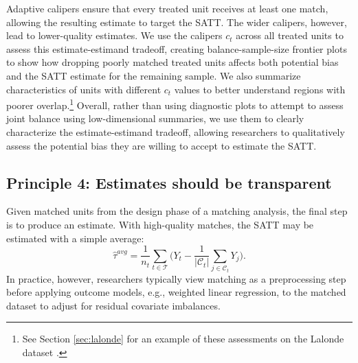 \documentclass{article}
\newcommand{\Rp}{\mathbb{R}^p}
\newcommand{\Ct}{\mathcal{C}_{t}}
\begin{document}
Adaptive calipers ensure that every treated unit receives at least one match, allowing the resulting estimate to target the SATT.
The wider calipers, however, lead to lower-quality estimates.
We use the calipers $c_t$ across all treated units to assess this estimate-estimand tradeoff,
creating balance-sample-size frontier plots \citep{king2017balance} to show how dropping poorly matched treated units affects both potential bias and the SATT estimate for the remaining sample.
We also summarize characteristics of units with different $c_t$ values to better understand regions with poorer overlap.\footnote{See Section \ref{sec:lalonde} for an example of these assessments on the Lalonde dataset \citep{lalonde1986evaluating}.}
Overall, rather than using diagnostic plots to attempt to assess joint balance using low-dimensional summaries, we use them to clearly characterize the estimate-estimand tradeoff, allowing researchers to qualitatively assess the potential bias they are willing to accept to estimate the SATT.


\subsection{Principle 4: Estimates should be transparent}

Given matched units from the design phase of a matching analysis, the final step is to produce an estimate.
With high-quality matches, the SATT may be estimated with a simple average:
$$\hat{\tau}^{avg} = \frac{1}{n_t} \sum_{t \in \mathcal{T}} \big( Y_t - \frac{1}{|\Ct|} \sum_{j \in \Ct} Y_j \big).$$
In practice, however, researchers typically view matching as a preprocessing step \citep{ho2007matching} before applying outcome models, e.g., weighted linear regression, to the matched dataset to adjust for residual covariate imbalances.
\end{document}

